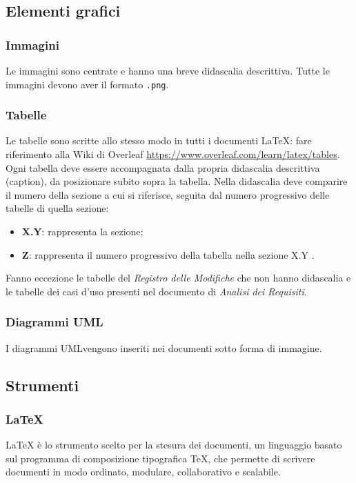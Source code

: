 \subsection{Elementi grafici}
\subsubsection{Immagini}
Le immagini sono centrate e hanno una breve didascalia descrittiva. Tutte le immagini devono aver il formato \texttt{.png}\glo .

\subsubsection{Tabelle}
Le tabelle sono scritte allo stesso modo in tutti i documenti \LaTeX{}: fare riferimento alla Wiki di Overleaf \url{https://www.overleaf.com/learn/latex/tables}. \\
Ogni tabella deve essere accompagnata dalla propria didascalia descrittiva (caption), da posizionare subito sopra la tabella.
Nella didascalia deve comparire il numero della sezione a cui si riferisce, seguita dal numero progressivo delle tabelle di quella sezione: \begin{itemize}
\item \textbf{X.Y}: rappresenta la sezione;
\item \textbf{Z}: rappresenta il numero progressivo della tabella nella sezione X.Y .
\end{itemize}
Fanno eccezione le tabelle del \textit{Registro delle Modifiche} che non hanno didascalia e le tabelle dei casi d'uso presenti nel documento di \textit{Analisi dei Requisiti}.

\subsubsection{Diagrammi UML}
I diagrammi UML\glo vengono inseriti nei documenti sotto forma di immagine.

\subsection{Strumenti}
\subsubsection{\LaTeX{}}
\LaTeX{} è lo strumento scelto per la stesura dei documenti, un linguaggio basato sul programma di composizione tipografica \TeX{}, che permette di scrivere documenti in modo ordinato, modulare, collaborativo e scalabile.

